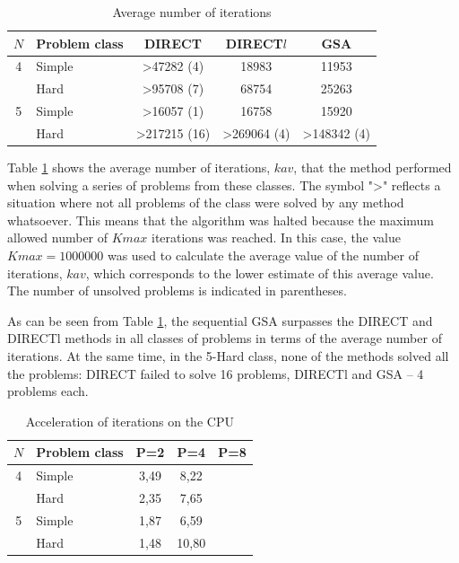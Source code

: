 \documentclass{svproc}
\begin{document}
\begin{table}
    \centering
    \begin{tabular}{|c|p{3cm}|c|c|c|}
    \hline
    \(N\) & Problem class & DIRECT & DIRECT\(l\) & GSA \\ \hline
    4 & Simple & >47282 (4) & 18983 & 11953\\ \cline{2-5}
      & Hard & >95708 (7) & 68754 & 25263\\ \hline
    5 & Simple & >16057 (1) & 16758 & 15920\\ \cline{2-5}
      & Hard & >217215 (16) & >269064 (4) & >148342 (4)\\ \hline
    \end{tabular}
    \caption{Average number of iterations}
    \label{table:average_iters}
\end{table} 

   Table  \ref{table:average_iters} shows the average number of iterations, $kav$, that the method performed when solving a series of problems from these classes. The symbol ">" reflects a situation where not all problems of the class were solved by any method whatsoever. This means that the algorithm was halted because the maximum allowed number of $Kmax$ iterations was reached. In this case, the value $Kmax = 1 000 000$ was used to calculate the average value of the number of iterations, $kav$, which corresponds to the lower estimate of this average value. The number of unsolved problems is indicated in parentheses.
   
  As can be seen from Table \ref{table:average_iters}, the sequential GSA surpasses the DIRECT and DIRECTl methods in all classes of problems in terms of the average number of iterations. At the same time, in the 5-Hard class, none of the methods solved all the problems: DIRECT failed to solve 16 problems, DIRECTl and GSA -- 4 problems each.


\begin{table}
    \centering
    \begin{tabular}{|c|p{3cm}|c|c|c|}
    \hline
    \(N\) & Problem class & P=2 & P=4 & P=8 \\ \hline
    4 & Simple  & 3,49 & 8,22  &  \\ \cline{2-5}
      & Hard    & 2,35 & 7,65  &  \\ \hline
    5 & Simple  & 1,87 & 6,59  &  \\ \cline{2-5}
      & Hard    & 1,48 & 10,80  &   \\ \hline
    \end{tabular}
    \caption{Acceleration of iterations on the CPU}
    \label{table:average_iters_AS_CPU}
\end{table}
\end{document}
